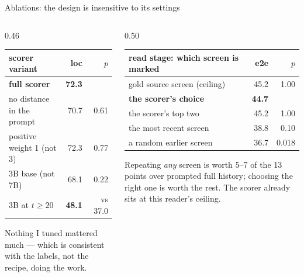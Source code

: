 \documentclass[aspectratio=169,10pt]{beamer}
\newcommand{\gr}[1]{{\color{ncgray}#1}}
\begin{document}
\begin{frame}{Ablations: the design is insensitive to its settings}
\vspace{0.4cm}
\begin{columns}[T]
\begin{column}{0.46\textwidth}
\centering\footnotesize
\begin{tabular}{lrr}
\toprule
scorer variant & loc & $p$\\
\midrule
\textbf{full scorer} & \textbf{72.3} & \\
no distance in the prompt & 70.7 & 0.61\\
positive weight 1 \gr{(not 3)} & 72.3 & 0.77\\
3B base \gr{(not 7B)} & 68.1 & 0.22\\
\quad 3B at $t\ge20$ & \textbf{48.1} & \gr{vs 37.0}\\
\bottomrule
\end{tabular}
\vspace{0.5em}
\gr{Nothing I tuned mattered much --- which is consistent with the labels, not the recipe, doing the work.}
\end{column}
\begin{column}{0.50\textwidth}
\centering\footnotesize
\begin{tabular}{lrr}
\toprule
read stage: which screen is marked & e2e & $p$\\
\midrule
gold source screen \gr{(ceiling)} & 45.2 & 1.00\\
\textbf{the scorer's choice} & \textbf{44.7} & \\
the scorer's top two & 45.2 & 1.00\\
the most recent screen & 38.8 & 0.10\\
a random earlier screen & 36.7 & \alert{0.018}\\
\bottomrule
\end{tabular}
\vspace{0.5em}
\gr{Repeating \emph{any} screen is worth 5--7 of the 13 points over prompted full history; choosing the right one is worth the rest. The scorer already sits at this reader's ceiling.}
\end{column}
\end{columns}
\end{frame}
\end{document}
